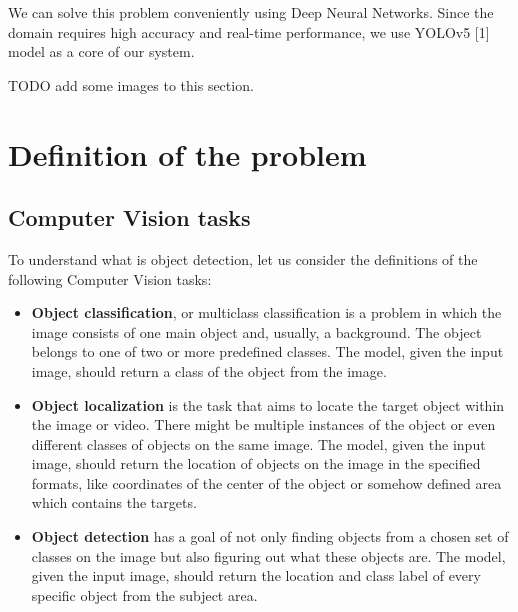 \documentclass[14pt,a4paper]{extarticle}
\newcounter{e}
\numberwithin{equation}{section}
\numberwithin{figure}{section}
\begin{document}
We can solve this problem conveniently using Deep Neural Networks. Since the domain requires high accuracy and real-time performance, we use YOLOv5 [1] model as a core of our system. 

TODO add some images to this section. 

\newpage
\thispagestyle{empty}
\section{Definition of the problem}

\subsection{Computer Vision tasks}
To understand what is object detection, let us consider the definitions of the following Computer Vision tasks:
\begin{itemize}
    \item \textbf{Object classification}, or multiclass classification is a problem in which the image consists of one main object and, usually, a background. The object belongs to one of two or more predefined classes. The model, given the input image, should return a class of the object from the image.
    
    \item \textbf{Object localization} is the task that aims to locate the target object within the image or video. There might be multiple instances of the object or even different classes of objects on the same image. The model, given the input image, should return the location of objects on the image in the specified formats, like coordinates of the center of the object or somehow defined area which contains the targets.
    
    \item \textbf{Object detection} has a goal of not only finding objects from a chosen set of classes on the image but also figuring out what these objects are. The model, given the input image, should return the location and class label of every specific object from the subject area.
\end{itemize}
\end{document}
